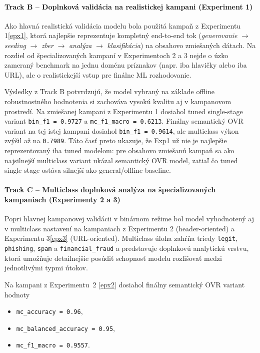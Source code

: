 \documentclass[conference]{IEEEtran}
\begin{document}
\paragraph{Track B – Doplnková validácia na realistickej kampani (Experiment 1)}

Ako hlavná realistická validácia modelu bola použitá kampaň
z Experimentu 1\ref{epx1}, ktorá najlepšie reprezentuje kompletný
end-to-end tok
(\textit{generovanie} $\rightarrow$ \textit{seeding} $\rightarrow$ \textit{zber}
$\rightarrow$ \textit{analýza} $\rightarrow$ \textit{klasifikácia})
na obsahovo zmiešaných dátach. Na rozdiel od špecializovaných kampaní
v Experimentoch 2 a 3 nejde o úzko zameraný benchmark na jednu doménu
príznakov (napr. iba hlavičky alebo iba URL), ale o realistickejší
vstup pre finálne ML rozhodovanie.

Výsledky z Track B potvrdzujú, že model vybraný na základe
offline robustnostného hodnotenia si zachováva vysokú kvalitu
aj v kampanovom prostredí. Na zmiešanej kampani z Experimentu 1
dosiahol tuned single-stage variant \texttt{bin\_f1 = 0.9727}
a \texttt{mc\_f1\_macro = 0.6213}. Finálny semantický OVR variant
na tej istej kampani dosiahol \texttt{bin\_f1 = 0.9614}, ale
multiclass výkon zvýšil až na \texttt{0.7989}. Táto časť preto
ukazuje, že Exp1 už nie je najlepšie reprezentovaný iba tuned modelom:
pre obsahovo zmiešanú kampaň sa ako najsilnejší multiclass variant
ukázal semantický OVR model, zatiaľ čo tuned single-stage ostáva
silnejší ako general/offline baseline.

\paragraph{Track C – Multiclass doplnková analýza na špecializovaných kampaniach (Experimenty 2 a 3)}

Popri hlavnej kampanovej validácii v binárnom režime bol model
vyhodnotený aj v multiclass nastavení na kampaniach z Experimentu 2
(header-oriented) a Experimentu 3\ref{epx3} (URL-oriented).
Multiclass úloha zahŕňa triedy \texttt{legit}, \texttt{phishing},
\texttt{spam} a \texttt{financial\_fraud} a predstavuje doplnkovú
analytickú vrstvu, ktorá umožňuje detailnejšie posúdiť schopnosť
modelu rozlišovať medzi jednotlivými typmi útokov.

Na kampani z Experimentu~2 \ref{epx2} dosiahol finálny semantický
OVR variant hodnoty
\begin{itemize}
    \item \texttt{mc\_accuracy = 0.96},
    \item \texttt{mc\_balanced\_accuracy = 0.95},
    \item \texttt{mc\_f1\_macro = 0.9557}.
\end{itemize}
\end{document}
